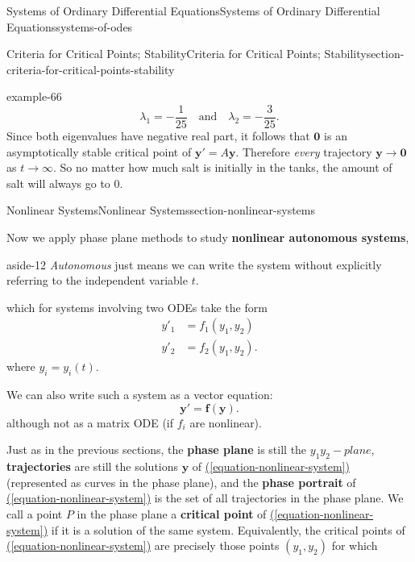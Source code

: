 \documentclass[oneside,10pt,]{book}
\newcommand{\terminology}[1]{\textbf{#1}}
\numberwithin{equation}{section}
\renewcommand{\vec}[1]{\mathbf{#1}}
\newcommand{\amp}{&}
\begin{document}
\begin{chapterptx}{Systems of Ordinary Differential Equations}{}{Systems of Ordinary Differential Equations}{}{}{systems-of-odes}
\begin{sectionptx}{Criteria for Critical Points; Stability}{}{Criteria for Critical Points; Stability}{}{}{section-criteria-for-critical-points-stability}
\begin{example}{}{example-66}
\begin{equation*}
\lambda_{1} = -\frac{1}{25}\quad\text{and}\quad\lambda_{2} = -\frac{3}{25}.
\end{equation*}
Since both eigenvalues have negative real part, it follows that \(\vec{0}\) is an asymptotically stable critical point of \(\vec{y}'=A\vec{y}\). Therefore \emph{every} trajectory \(\vec{y}\to\vec{0}\) as \(t\to\infty\). So no matter how much salt is initially in the tanks, the amount of salt will always go to \(0\).%
\end{example}
\end{sectionptx}
%
%
\typeout{************************************************}
\typeout{************************************************}
%
\begin{sectionptx}{Nonlinear Systems}{}{Nonlinear Systems}{}{}{section-nonlinear-systems}
\begin{introduction}{}%
\hypertarget{p-399}{}%
Now we apply phase plane methods to study \terminology{nonlinear autonomous systems}, \begin{aside}{}{aside-12}%
\hypertarget{p-400}{}%
\emph{Autonomous} just means we can write the system without explicitly referring to the independent variable \(t\).%
\end{aside}
 which for systems involving two ODEs take the form%
\begin{align*}
y'_{1} \amp = f_{1}(y_{1},y_{2})\\
y'_{2} \amp = f_{2}(y_{1},y_{2})\text{.}
\end{align*}
where \(y_{i} = y_{i}(t)\).%
\par
\hypertarget{p-401}{}%
We can also write such a system as a vector equation:%
\begin{equation}
\vec{y}' = \vec{f}(\vec{y})\text{.}\label{equation-nonlinear-system}
\end{equation}
although not as a matrix ODE (if \(f_{i}\) are nonlinear).%
\par
\hypertarget{p-402}{}%
Just as in the previous sections, the \terminology{phase plane} is still the \(y_{1}y_{2}-plane\), \terminology{trajectories} are still the solutions \(\vec{y}\) of \hyperref[equation-nonlinear-system]{(\ref{equation-nonlinear-system})} (represented as curves in the phase plane), and the \terminology{phase portrait} of \hyperref[equation-nonlinear-system]{(\ref{equation-nonlinear-system})} is the set of all trajectories in the phase plane. We call a point \(P\) in the phase plane a \terminology{critical point} of \hyperref[equation-nonlinear-system]{(\ref{equation-nonlinear-system})} if it is a solution of the same system. Equivalently, the critical points of \hyperref[equation-nonlinear-system]{(\ref{equation-nonlinear-system})} are precisely those points \((y_{1},y_{2})\) for which%

\end{introduction}
\end{sectionptx}
\end{chapterptx}
\end{document}
